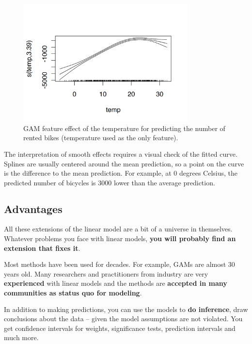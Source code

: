 \documentclass[
  10pt,
]{scrbook}
\begin{document}
\begin{figure}

{\centering \includegraphics[width=0.8\textwidth]{images/splines-curve-1} 

}

\caption{GAM feature effect of the temperature for predicting the number of rented bikes (temperature used as the only feature).}\label{fig:splines-curve}
\end{figure}

The interpretation of smooth effects requires a visual check of the fitted curve.
Splines are usually centered around the mean prediction, so a point on the curve is the difference to the mean prediction.
For example, at 0 degrees Celsius, the predicted number of bicycles is 3000 lower than the average prediction.

\hypertarget{advantages-1}{%
\subsection{Advantages}\label{advantages-1}}

All these extensions of the linear model are a bit of a universe in themselves.
Whatever problems you face with linear models, \textbf{you will probably find an extension that fixes it}.

Most methods have been used for decades.
For example, GAMs are almost 30 years old.
Many researchers and practitioners from industry are very \textbf{experienced} with linear models and the methods are \textbf{accepted in many communities as status quo for modeling}.

In addition to making predictions, you can use the models to \textbf{do inference}, draw conclusions about the data -- given the model assumptions are not violated.
You get confidence intervals for weights, significance tests, prediction intervals and much more.
\end{document}
